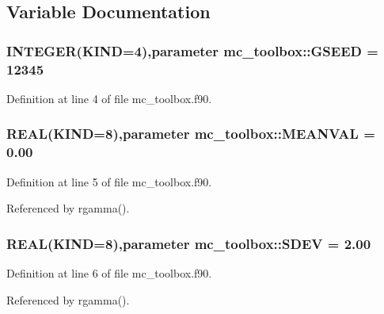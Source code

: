 \subsection{Variable Documentation}
\hypertarget{namespacemc__toolbox_a2b3c4edff260f415453579697b0a5282}{
\subsubsection[{GSEED}]{\setlength{\rightskip}{0pt plus 5cm}INTEGER(KIND=4),parameter {\bf mc\_\-toolbox::GSEED} = 12345}}
\label{namespacemc__toolbox_a2b3c4edff260f415453579697b0a5282}


Definition at line 4 of file mc\_\-toolbox.f90.\hypertarget{namespacemc__toolbox_a9e72a666484c36244e37a8083e792dd8}{
\subsubsection[{MEANVAL}]{\setlength{\rightskip}{0pt plus 5cm}REAL(KIND=8),parameter {\bf mc\_\-toolbox::MEANVAL} = 0.00}}
\label{namespacemc__toolbox_a9e72a666484c36244e37a8083e792dd8}


Definition at line 5 of file mc\_\-toolbox.f90.

Referenced by rgamma().\hypertarget{namespacemc__toolbox_a5655149a57d9d21f98b7515536fe1a1b}{
\subsubsection[{SDEV}]{\setlength{\rightskip}{0pt plus 5cm}REAL(KIND=8),parameter {\bf mc\_\-toolbox::SDEV} = 2.00}}
\label{namespacemc__toolbox_a5655149a57d9d21f98b7515536fe1a1b}


Definition at line 6 of file mc\_\-toolbox.f90.

Referenced by rgamma().
